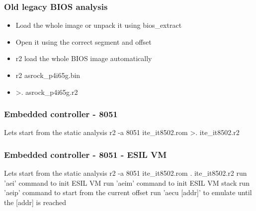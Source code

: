 \documentclass[10pt, compress]{beamer}
\begin{document}

\begin{frame}[fragile]
  \frametitle{Old legacy BIOS analysis}
  \begin{itemize}
    \item Load the whole image or unpack it using bios\_extract
	\item Open it using the correct segment and offset
	\item r2 load the whole BIOS image automatically
	\item r2 asrock\_p4i65g.bin
	\item >. asrock\_p4i65g.r2
  \end{itemize}
\end{frame}


\begin{frame}[fragile]
  \frametitle{Embedded controller - 8051}
  \center Lets start from the static analysis
  \center r2 -a 8051 ite\_it8502.rom
  \center >. ite\_it8502.r2
\end{frame}


\begin{frame}[fragile]
  \frametitle{Embedded controller - 8051 - ESIL VM}
  \center Lets start from the static analysis
  \center r2 -a 8051 ite\_it8502.rom
  \center . ite\_it8502.r2
  \center run 'aei' command to init ESIL VM
  \center run 'aeim' command to init ESIL VM stack
  \center run 'aeip' command to start from the current offset
  \center run 'aecu [addr]' to emulate until the [addr] is reached
\end{frame}
\end{document}
